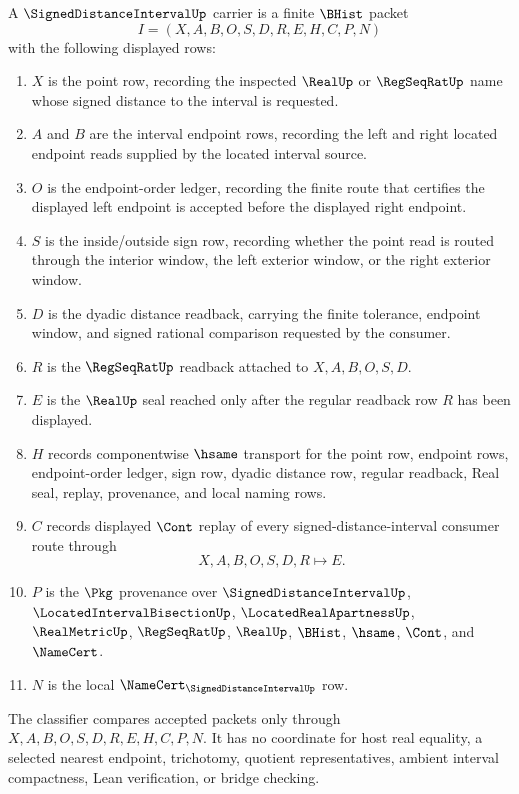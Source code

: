 \begin{definition}
\label{def:signed-distance-interval-carrier}
A $\SignedDistanceIntervalUp$ carrier is a finite $\BHist$ packet
$$
I=(X,A,B,O,S,D,R,E,H,C,P,N)
$$
with the following displayed rows:
\begin{enumerate}
\item $X$ is the point row, recording the inspected $\RealUp$ or $\RegSeqRatUp$ name whose signed distance to the interval is requested.
\item $A$ and $B$ are the interval endpoint rows, recording the left and right located endpoint reads supplied by the located interval source.
\item $O$ is the endpoint-order ledger, recording the finite route that certifies the displayed left endpoint is accepted before the displayed right endpoint.
\item $S$ is the inside/outside sign row, recording whether the point read is routed through the interior window, the left exterior window, or the right exterior window.
\item $D$ is the dyadic distance readback, carrying the finite tolerance, endpoint window, and signed rational comparison requested by the consumer.
\item $R$ is the $\RegSeqRatUp$ readback attached to $X,A,B,O,S,D$.
\item $E$ is the $\RealUp$ seal reached only after the regular readback row $R$ has been displayed.
\item $H$ records componentwise $\hsame$ transport for the point row, endpoint rows, endpoint-order ledger, sign row, dyadic distance row, regular readback, Real seal, replay, provenance, and local naming rows.
\item $C$ records displayed $\Cont$ replay of every signed-distance-interval consumer route through
$$
X,A,B,O,S,D,R \longmapsto E .
$$
\item $P$ is the $\Pkg$ provenance over $\SignedDistanceIntervalUp$, $\LocatedIntervalBisectionUp$, $\LocatedRealApartnessUp$, $\RealMetricUp$, $\RegSeqRatUp$, $\RealUp$, $\BHist$, $\hsame$, $\Cont$, and $\NameCert$.
\item $N$ is the local $\NameCert_{\SignedDistanceIntervalUp}$ row.
\end{enumerate}
The classifier compares accepted packets only through $X,A,B,O,S,D,R,E,H,C,P,N$. It has no coordinate for host real equality, a selected nearest endpoint, trichotomy, quotient representatives, ambient interval compactness, Lean verification, or bridge checking.
\end{definition}

